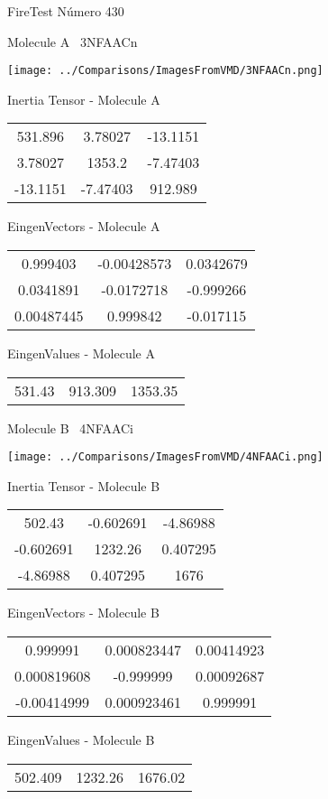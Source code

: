 \vtab[-3cm]
\begin{center}
{\large FireTest \tab Número 430}
\end{center}
\begin{multicols}{2}
\begin{center}

Molecule A \
3NFAACn

\texttt{[image: ../Comparisons/ImagesFromVMD/3NFAACn.png]}

Inertia Tensor - Molecule A \\
\begin{tabular}{|c c c|}
531.896	 & 	3.78027	 & 	-13.1151	 \\
3.78027	 & 	1353.2	 & 	-7.47403	 \\
-13.1151	 & 	-7.47403	 & 	912.989
\end{tabular}

\vtab
 EingenVectors - Molecule A     \\
\begin{tabular}{|c c c|}
0.999403	 & 	-0.00428573	 & 	0.0342679	 \\
0.0341891	 & 	-0.0172718	 & 	-0.999266	 \\
0.00487445	 & 	0.999842	 & 	-0.017115
\end{tabular}

\vtab
 EingenValues - Molecule A     \\
\begin{tabular}{|c c c|}
531.43	 & 	913.309	 & 	1353.35	 \\
\end{tabular}
\columnbreak

Molecule B \
4NFAACi

\texttt{[image: ../Comparisons/ImagesFromVMD/4NFAACi.png]}

Inertia Tensor - Molecule B \\
\begin{tabular}{|c c c|}
502.43	 & 	-0.602691	 & 	-4.86988	 \\
-0.602691	 & 	1232.26	 & 	0.407295	 \\
-4.86988	 & 	0.407295	 & 	1676
\end{tabular}

\vtab
 EingenVectors - Molecule B     \\
\begin{tabular}{|c c c|}
0.999991	 & 	0.000823447	 & 	0.00414923	 \\
0.000819608	 & 	-0.999999	 & 	0.00092687	 \\
-0.00414999	 & 	0.000923461	 & 	0.999991
\end{tabular}

\vtab
 EingenValues - Molecule B     \\
\begin{tabular}{|c c c|}
502.409	 & 	1232.26	 & 	1676.02	 \\
\end{tabular}

\end{center}
\end{multicols}


